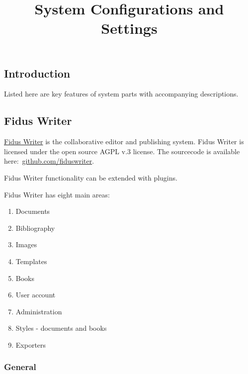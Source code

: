 \documentclass{article}
\begin{document}
\title{System Configurations and Settings}

\maketitle


\subsection{Introduction}\label{H9202894}



Listed here are key features of system parts with accompanying descriptions.


\subsection{Fidus Writer}\label{H3154410}



\href{https://www.fiduswriter.org/}{Fidus Writer} is the collaborative editor and publishing system. Fidus Writer is licensed under the open source AGPL v.3 license. The sourcecode is available here: \href{http://github.com/fiduswriter}{github.com/fiduswriter}.


Fidus Writer functionality can be extended with plugins.


Fidus Writer has eight main areas:

\begin{enumerate}
\item Documents


\item Bibliography


\item Images


\item Templates


\item Books


\item User account


\item Administration


\item Styles - documents and books


\item Exporters


\end{enumerate}

\subsubsection{General }\label{H1068085}
\end{document}
